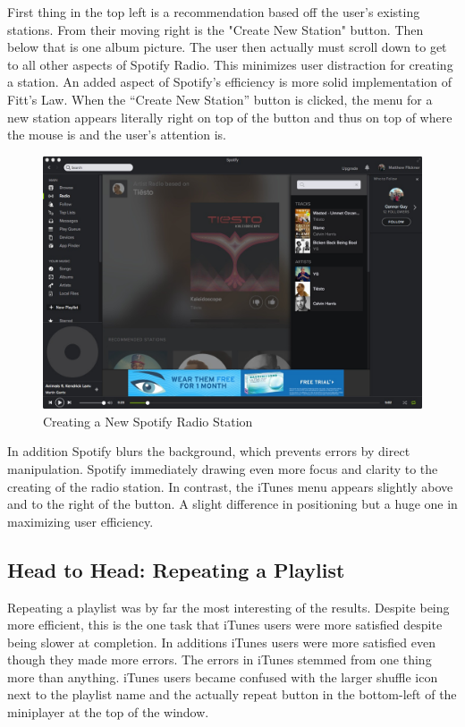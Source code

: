 \documentclass[a4paper]{article}
\begin{document}
First thing in the top left is a recommendation based off the user's existing stations. From their moving right is the "Create New Station" button. Then below that is one album picture. The user then actually must scroll down to get to all other aspects of Spotify Radio. This minimizes user distraction for creating a station. An added aspect of Spotify's efficiency is more solid implementation of Fitt's Law. When the ``Create New Station'' button is clicked, the menu for a new station appears literally right on top of the button and thus on top of where the mouse is and the user's attention is.

\begin{figure}[H]
\centering
\includegraphics[width=.6\textwidth]{spotifyradio2.jpg}
\caption{\label{heuristic: spotifyRadio2} Creating a New Spotify Radio Station}
\end{figure}

In addition Spotify blurs the background, which prevents errors by direct manipulation. Spotify immediately drawing even more focus and clarity to the creating of the radio station. In contrast, the iTunes menu appears slightly above and to the right of the button. A slight difference in positioning but a huge one in maximizing user efficiency. 

\subsection{Head to Head: Repeating a Playlist}
Repeating a playlist was by far the most interesting of the results. Despite being more efficient, this is the one task that iTunes users were more satisfied despite being slower at completion. In additions iTunes users were more satisfied even though they made more errors. The errors in iTunes stemmed from one thing more than anything. iTunes users became confused with the larger shuffle icon next to the playlist name and the actually repeat button in the bottom-left of the miniplayer at the top of the window. 
\end{document}
